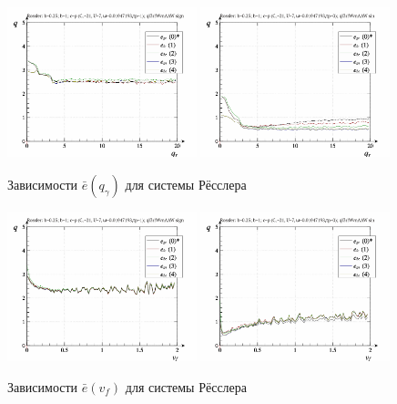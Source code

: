 \begin{figure}[ht!]
\begin{center}
  \includegraphics[width=0.49\textwidth]{p/cha/ross/ross_id-p_q_gamma_ql3rlWvnAAW_sign.png}
  \hfill
  \includegraphics[width=0.49\textwidth]{p/cha/ross/ross_id-p_q_gamma_ql3rlWvnAAW_sin.png}
\end{center}
  \caption{Зависимости $\bar{e}(q_\gamma)$ для системы Рёсслера}
\label{atu:f:ross_e_q_gamma}
\end{figure}

\begin{figure}[ht!]
\begin{center}
  \includegraphics[width=0.49\textwidth]{p/cha/ross/ross_id-p_v_f_ql3rlWvnAAW_sign.png}
  \hfill
  \includegraphics[width=0.49\textwidth]{p/cha/ross/ross_id-p_v_f_ql3rlWvnAAW_sin.png}
\end{center}
  \caption{Зависимости $\bar{e}(v_f)$ для системы Рёсслера}
\label{atu:f:ross_e_v_f}
\end{figure}


